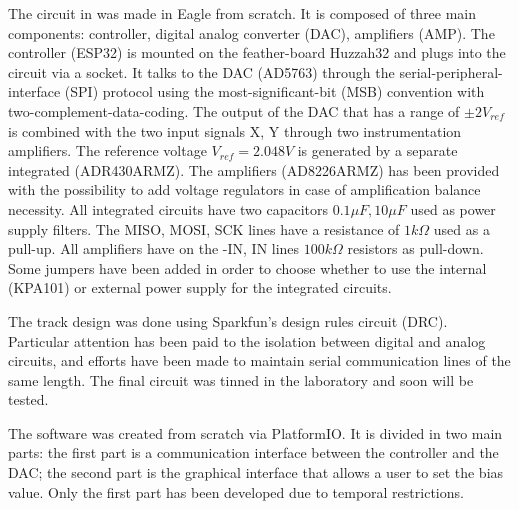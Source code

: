 The circuit in  was made in Eagle from scratch. It is composed of three main components: controller, digital analog converter (DAC), amplifiers (AMP).
The controller (ESP32) is mounted on the feather-board Huzzah32 and plugs into the circuit via a socket. It talks to the DAC (AD5763) through the serial-peripheral-interface (SPI) protocol using the most-significant-bit (MSB) convention with two-complement-data-coding.
The output of the DAC that has a range of $\pm 2 V_{ref}$ is combined with the two input signals X, Y through two instrumentation amplifiers. The reference voltage $V_{ref} = 2.048V$ is generated by a separate integrated (ADR430ARMZ).
The amplifiers (AD8226ARMZ) has been provided with the possibility to add voltage regulators in case of amplification balance necessity.
All integrated circuits have two capacitors $0.1 \mu F, 10 \mu F$ used as power supply filters. The MISO, MOSI, SCK lines have a resistance of $1 k \Omega$ used as a pull-up.
All amplifiers have on the -IN, IN lines $100 k \Omega$ resistors as pull-down. Some jumpers have been added in order to choose whether to use the internal (KPA101) or external power supply for the integrated circuits.

The track design was done using Sparkfun’s design rules circuit (DRC). Particular attention has been paid to the isolation between digital and analog circuits, and efforts have been made to maintain serial communication lines of the same length. The final circuit was tinned in the laboratory and soon will be tested.

The software was created from scratch via PlatformIO. It is divided in two main parts: the first part is a communication interface between the controller and the DAC; the second part is the graphical interface that allows a user to set the bias value. Only the first part has been developed due to temporal restrictions.


